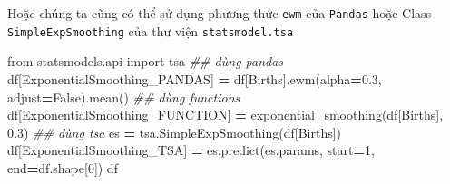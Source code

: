 \documentclass[
]{book}
\newenvironment{Shaded}{\begin{snugshade}}{\end{snugshade}}
\newcommand{\CommentTok}[1]{\textcolor[rgb]{0.56,0.35,0.01}{\textit{#1}}}
\newcommand{\DecValTok}[1]{\textcolor[rgb]{0.00,0.00,0.81}{#1}}
\newcommand{\FloatTok}[1]{\textcolor[rgb]{0.00,0.00,0.81}{#1}}
\newcommand{\ImportTok}[1]{#1}
\newcommand{\NormalTok}[1]{#1}
\newcommand{\OperatorTok}[1]{\textcolor[rgb]{0.81,0.36,0.00}{\textbf{#1}}}
\newcommand{\StringTok}[1]{\textcolor[rgb]{0.31,0.60,0.02}{#1}}
\newcommand{\VariableTok}[1]{\textcolor[rgb]{0.00,0.00,0.00}{#1}}
\begin{document}
Hoặc chúng ta cũng có thể sử dụng phương thức \texttt{ewm} của \texttt{Pandas} hoặc Class \texttt{SimpleExpSmoothing} của thư viện \texttt{statsmodel.tsa}

\begin{Shaded}
\begin{Highlighting}[]
\ImportTok{from}\NormalTok{ statsmodels.api }\ImportTok{import}\NormalTok{ tsa}
\CommentTok{\#\# dùng pandas}
\NormalTok{df[}\StringTok{\textquotesingle{}ExponentialSmoothing\_PANDAS\textquotesingle{}}\NormalTok{] }\OperatorTok{=}\NormalTok{ df[}\StringTok{\textquotesingle{}Births\textquotesingle{}}\NormalTok{].ewm(alpha}\OperatorTok{=}\FloatTok{0.3}\NormalTok{, adjust}\OperatorTok{=}\VariableTok{False}\NormalTok{).mean()}
\CommentTok{\#\# dùng functions}
\NormalTok{df[}\StringTok{\textquotesingle{}ExponentialSmoothing\_FUNCTION\textquotesingle{}}\NormalTok{] }\OperatorTok{=}\NormalTok{ exponential\_smoothing(df[}\StringTok{\textquotesingle{}Births\textquotesingle{}}\NormalTok{], }\FloatTok{0.3}\NormalTok{)}
\CommentTok{\#\# dùng tsa}
\NormalTok{es }\OperatorTok{=}\NormalTok{ tsa.SimpleExpSmoothing(df[}\StringTok{\textquotesingle{}Births\textquotesingle{}}\NormalTok{])}
\NormalTok{df[}\StringTok{\textquotesingle{}ExponentialSmoothing\_TSA\textquotesingle{}}\NormalTok{] }\OperatorTok{=}\NormalTok{ es.predict(es.params, start}\OperatorTok{=}\DecValTok{1}\NormalTok{, end}\OperatorTok{=}\NormalTok{df.shape[}\DecValTok{0}\NormalTok{])}
\NormalTok{df}
\end{Highlighting}
\end{Shaded}
\end{document}

